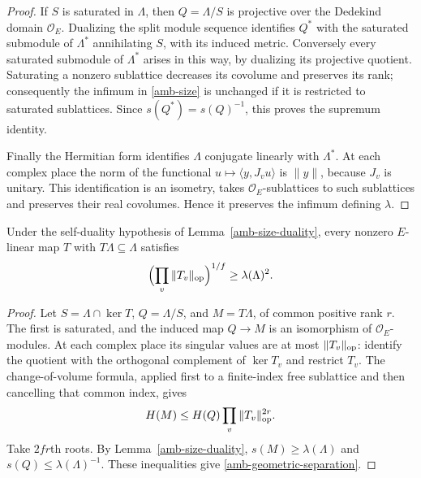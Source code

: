 \begin{proof}
If $S$ is saturated in $\Lambda$, then $Q=\Lambda/S$ is
projective over the Dedekind domain $\mathcal O_E$.
Dualizing the split module sequence identifies $Q^*$ with the
saturated submodule of $\Lambda^*$ annihilating $S$, with its
induced metric. Conversely every saturated submodule of
$\Lambda^*$ arises in this way, by dualizing its projective
quotient. Saturating a nonzero sublattice decreases its covolume
and preserves its rank; consequently the infimum in
\eqref{amb-size} is unchanged if it is restricted to saturated
sublattices. Since $s(Q^*)=s(Q)^{-1}$, this proves the supremum
identity.

Finally the Hermitian form identifies $\Lambda$ conjugate
linearly with $\Lambda^*$. At each complex place the norm of the
functional $u\mapsto\langle y,J_vu\rangle$ is $\|y\|$, because
$J_v$ is unitary. This identification is an isometry, takes
$\mathcal O_E$-sublattices to such sublattices and preserves their
real covolumes. Hence it preserves the infimum defining
$\lambda$.
\end{proof}

\begin{lemma}\label{amb-map-separation}
Under the self-duality hypothesis of Lemma~\ref{amb-size-duality},
every nonzero $E$-linear map $T$ with
$T\Lambda\subseteq\Lambda$ satisfies
\begin{equation}\label{amb-geometric-separation}
            \Bigl(\prod_v\|T_v\|_{\rm op}\Bigr)^{1/f}
                                     \ge\lambda(\Lambda)^2.
\end{equation}
\end{lemma}
\begin{proof}
Let $S=\Lambda\cap\ker T$, $Q=\Lambda/S$, and $M=T\Lambda$,
of common positive rank $r$. The first is saturated, and the
induced map $Q\to M$ is an isomorphism of
$\mathcal O_E$-modules. At each complex place its singular
values are at most $\|T_v\|_{\rm op}$: identify the quotient
with the orthogonal complement of $\ker T_v$ and restrict $T_v$.
The change-of-volume formula, applied first to a finite-index
free sublattice and then cancelling that common index, gives
\[
                 H(M)\le H(Q)\prod_v\|T_v\|_{\rm op}^{2r}.
\]
Take $2fr$th roots. By Lemma~\ref{amb-size-duality},
$s(M)\ge\lambda(\Lambda)$ and
$s(Q)\le\lambda(\Lambda)^{-1}$. These inequalities give
\eqref{amb-geometric-separation}.
\end{proof}


